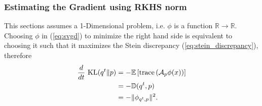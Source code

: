 \documentclass{article}
\begin{document}



\subsubsection{Estimating the Gradient using RKHS norm}
This sections assumes a 1-Dimensional problem, i.e. $\phi$ is a function $\mathbb{R} \to \mathbb{R}$.
Choosing $\phi$ in (\ref{eq:svgd}) to minimize the right hand side is equivalent to
choosing it such that it maximizes the Stein discrepancy (\ref{eq:stein_discrepancy}),
therefore
\begin{align}
    \frac{d}{dt}\ \textrm{KL}( q^t \| p ) &= 
    - \mathbb{E} \left[ \text{trace} \left( \mathcal{A}_p \phi(x) \right) \right] \\
                             &= - \mathbb{D}(q^t, p )\\
                             &= - \|\phi_{ q^t, p }\|^2  .
\end{align}
\end{document}
